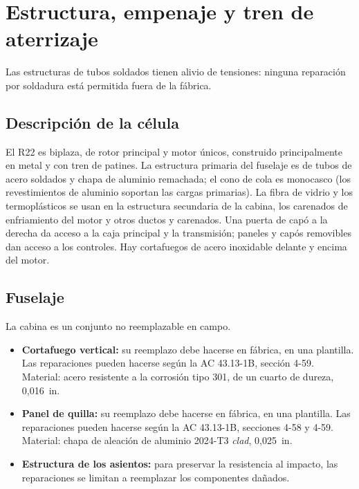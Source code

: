 \chapter{Estructura, empenaje y tren de aterrizaje}
\label{cap:mm-estructura}

\opening{Las estructuras de tubos soldados tienen alivio de tensiones: ninguna reparación por soldadura está permitida fuera de la fábrica.}

\section{Descripción de la célula}

El R22 es biplaza, de rotor principal y motor únicos, construido principalmente en metal y con tren de patines. La estructura primaria del fuselaje es de tubos de acero soldados y chapa de aluminio remachada; el cono de cola es monocasco (los revestimientos de aluminio soportan las cargas primarias). La fibra de vidrio y los termoplásticos se usan en la estructura secundaria de la cabina, los carenados de enfriamiento del motor y otros ductos y carenados. Una puerta de capó a la derecha da acceso a la caja principal y la transmisión; paneles y capós removibles dan acceso a los controles. Hay cortafuegos de acero inoxidable delante y encima del motor.

\section{Fuselaje}

La cabina es un conjunto no reemplazable en campo.

\begin{itemize}
\item \textbf{Cortafuego vertical:} su reemplazo debe hacerse en fábrica, en una plantilla. Las reparaciones pueden hacerse según la AC 43.13-1B, sección 4-59. Material: acero resistente a la corrosión tipo 301, de un cuarto de dureza, 0,016~in.
\item \textbf{Panel de quilla:} su reemplazo debe hacerse en fábrica, en una plantilla. Las reparaciones pueden hacerse según la AC 43.13-1B, secciones 4-58 y 4-59. Material: chapa de aleación de aluminio 2024-T3 \emph{clad}, 0,025~in.
\item \textbf{Estructura de los asientos:} para preservar la resistencia al impacto, las reparaciones se limitan a reemplazar los componentes dañados.
\end{itemize}

